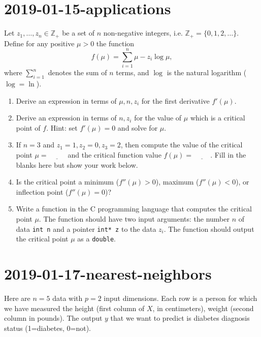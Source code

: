 \documentclass{article}
\begin{document}
\section{2019-01-15-applications}
Let $z_1, \dots, z_n\in\mathbb Z_+$ be a set of $n$ non-negative integers,
i.e. $\mathbb Z_+=\{0, 1, 2, \dots\}$. Define for any positive $\mu>0$ the function
$$ f(\mu) = \sum_{i=1}^n \mu - z_i\log \mu, $$
where $\sum_{i=1}^n$ denotes the sum of $n$ terms, and $\log$ is the
natural logarithm ($\log=\ln$).

\begin{enumerate}
\item Derive an expression in terms of $\mu,n,z_i$ for the first derivative
  $f'(\mu)$. 

\vskip 1in
\item Derive an expression in terms of $n,z_i$ for the value of $\mu$
  which is a critical point of $f$. Hint: set $f'(\mu)=0$ and solve
  for $\mu$.

\vskip 1in
\item If $n=3$ and $z_1=1, z_2=0, z_3=2$, then compute the value of
  the critical point $\mu=\underline{\hspace{1cm}}$ and the critical
  function value $f(\mu)=\underline{\hspace{1cm}}$. Fill in the blanks
  here but show your work below.

\vskip 1in
\item Is the critical point a minimum ($f''(\mu)>0$), maximum
  ($f''(\mu)<0$), or inflection point ($f''(\mu)=0$)?

\vskip 1in
\item Write a function in the C programming language that computes the
  critical point $\mu$. The function should have two input arguments:
  the number $n$ of data \texttt{int n} and a pointer \texttt{int* z}
  to the data $z_i$. The function should output the critical point
  $\mu$ as a \texttt{double}.
\end{enumerate}

\newpage
\section{2019-01-17-nearest-neighbors}
Here are $n=5$ data with $p=2$ input dimensions. Each row is a person
for which we have measured the height (first column of $X$, in
centimeters), weight (second column in pounds). The output $y$ that we
want to predict is diabetes diagnosis status (1=diabetes, 0=not).
\end{document}
